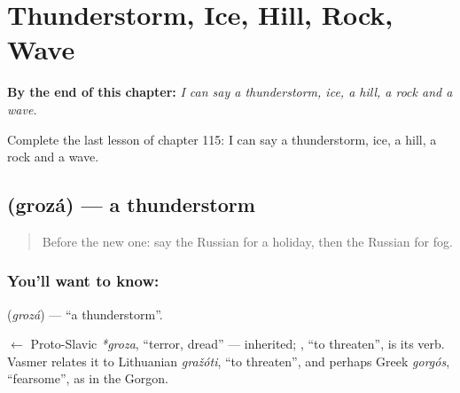 
\chapter{Thunderstorm, Ice, Hill, Rock, Wave}
\label{ch:ru-thunderstorm-ice-hill-rock-wave}

\begin{chapteropening}
\textbf{By the end of this chapter:} \emph{I can say a thunderstorm, ice, a hill, a rock and a wave.}

Complete the last lesson of chapter 115: I can say a thunderstorm, ice, a hill, a rock and a wave.
\end{chapteropening}

\section[\texorpdfstring{\ru{гроза} (grozá)}{гроза (grozá)}]{ (grozá) — a thunderstorm}

\label{lesson:RU-C115-thunderstorm}



\begin{quote}
Before the new one: say the Russian for a holiday, then the Russian for fog.
\end{quote}

\subsection*{You'll want to know: }
\textbf{} (\emph{grozá}) — \textquotedblleft{}a thunderstorm\textquotedblright{}.

\begin{cousinweb}
\textbf{} $\leftarrow$ Proto-Slavic \emph{*groza}, \textquotedblleft{}terror, dread\textquotedblright{} — inherited; \emph{}, \textquotedblleft{}to threaten\textquotedblright{}, is its verb. Vasmer relates it to Lithuanian \emph{gražóti}, \textquotedblleft{}to threaten\textquotedblright{}, and perhaps Greek \emph{gorgós}, \textquotedblleft{}fearsome\textquotedblright{}, as in the Gorgon.
\end{cousinweb}

